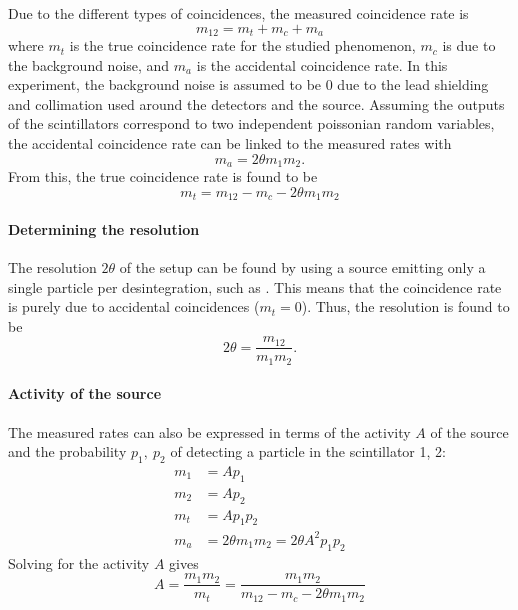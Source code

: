 Due to the different types of coincidences, the measured coincidence rate is
\begin{equation}
    m_{12} = m_t + m_c + m_a
\end{equation}
where \(m_t\) is the true coincidence rate for the studied phenomenon, \(m_c\) is due to the background noise, and \(m_a\) is the accidental coincidence rate. In this experiment, the background noise is assumed to be \(0\) due to the lead shielding and collimation used around the detectors and the source. Assuming the outputs of the scintillators correspond to two independent poissonian random variables, the accidental coincidence rate can be linked to the measured rates with
\begin{equation}
    m_a = 2\theta m_1 m_2.
\end{equation}
From this, the true coincidence rate is found to be
\begin{equation}
    m_t = m_{12} - m_c - 2\theta m_1 m_2
\end{equation}

\paragraph{Determining the resolution}
The resolution \(2 \theta\) of the setup can be found by using a source emitting only a single particle per desintegration, such as \cesium. This means that the coincidence rate is purely due to accidental coincidences (\(m_t = 0\)). Thus, the resolution is found to be
\begin{equation} \label{eq:coincidence_time_resolution}
    2\theta = \frac{m_{12}}{m_1 m_2}.
\end{equation}

\paragraph{Activity of the source}
The measured rates can also be expressed in terms of the activity \(A\) of the source and the probability \(p_1,\ p_2\) of detecting a particle in the scintillator 1, 2:
\begin{equation}
    \begin{aligned}
        m_1 &= A p_1 \\
        m_2 &= A p_2 \\
        m_t &= A p_1 p_2 \\
        m_a &= 2\theta m_1 m_2 = 2\theta A^2 p_1 p_2
    \end{aligned}
\end{equation}
Solving for the activity \(A\) gives
\begin{equation} \label{eq:activity}
    A = \frac{m_1 m_2}{m_t} = \frac{m_1 m_2}{m_{12} - m_c - 2\theta m_1 m_2}
\end{equation}

